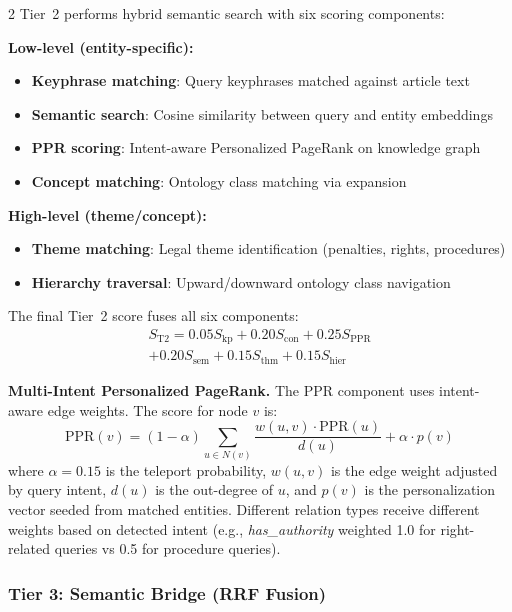 \documentclass[11pt,a4paper]{article}
\begin{document}
\begin{multicols}{2}
Tier~2 performs hybrid semantic search with six scoring components:

\textbf{Low-level (entity-specific):}
\begin{itemize}
\item \textbf{Keyphrase matching}: Query keyphrases matched against article text
\item \textbf{Semantic search}: Cosine similarity between query and entity embeddings
\item \textbf{PPR scoring}: Intent-aware Personalized PageRank on knowledge graph
\item \textbf{Concept matching}: Ontology class matching via expansion
\end{itemize}

\textbf{High-level (theme/concept):}
\begin{itemize}
\item \textbf{Theme matching}: Legal theme identification (penalties, rights, procedures)
\item \textbf{Hierarchy traversal}: Upward/downward ontology class navigation
\end{itemize}

The final Tier~2 score fuses all six components:
\begin{multline}
S_{\text{T2}} = 0.05 S_{\text{kp}} + 0.20 S_{\text{con}} + 0.25 S_{\text{PPR}} \\
+ 0.20 S_{\text{sem}} + 0.15 S_{\text{thm}} + 0.15 S_{\text{hier}}
\end{multline}

\textbf{Multi-Intent Personalized PageRank.} The PPR component uses intent-aware edge weights. The score for node $v$ is:
\begin{equation}
\text{PPR}(v) = (1-\alpha) \sum_{u \in N(v)} \frac{w(u,v) \cdot \text{PPR}(u)}{d(u)} + \alpha \cdot p(v)
\end{equation}
where $\alpha=0.15$ is the teleport probability, $w(u,v)$ is the edge weight adjusted by query intent, $d(u)$ is the out-degree of $u$, and $p(v)$ is the personalization vector seeded from matched entities. Different relation types receive different weights based on detected intent (e.g., \textit{has\_authority} weighted 1.0 for right-related queries vs 0.5 for procedure queries).

\subsubsection{Tier 3: Semantic Bridge (RRF Fusion)}


\end{multicols}
\end{document}
